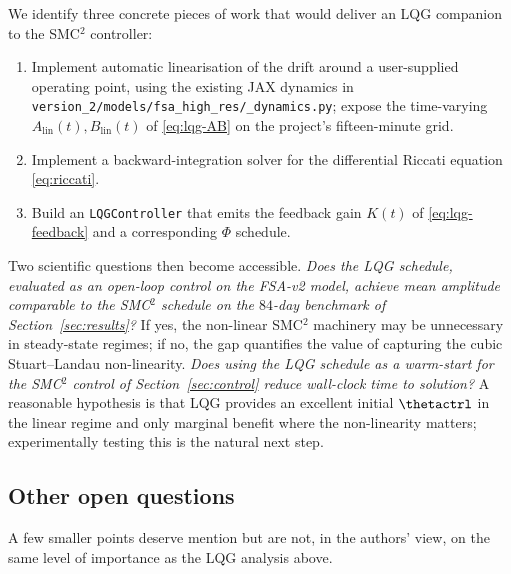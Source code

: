 We identify three concrete pieces of work that would deliver an LQG
companion to the SMC${}^2$ controller:
\begin{enumerate}
  \item Implement automatic linearisation of the drift around a
        user-supplied operating point, using the existing JAX dynamics
        in \texttt{version\_2/models/fsa\_high\_res/\_dynamics.py};
        expose the time-varying $A_{\mathrm{lin}}(t),B_{\mathrm{lin}}(t)$
        of \eqref{eq:lqg-AB} on the project's fifteen-minute grid.
  \item Implement a backward-integration solver for the differential
        Riccati equation \eqref{eq:riccati}.
  \item Build an \texttt{LQGController} that emits the feedback gain
        $K(t)$ of \eqref{eq:lqg-feedback} and a corresponding
        $\Phi$ schedule.
\end{enumerate}
Two scientific questions then become accessible. \emph{Does the LQG
schedule, evaluated as an open-loop control on the FSA-v2 model, achieve
mean amplitude comparable to the SMC${}^2$ schedule on the $84$-day
benchmark of Section~\ref{sec:results}?} If yes, the non-linear
SMC${}^2$ machinery may be unnecessary in steady-state regimes; if
no, the gap quantifies the value of capturing the cubic
Stuart--Landau non-linearity. \emph{Does using the LQG schedule as a
warm-start for the SMC${}^2$ control of Section~\ref{sec:control}
reduce wall-clock time to solution?} A reasonable hypothesis is that
LQG provides an excellent initial $\thetactrl$ in the linear regime
and only marginal benefit where the non-linearity matters;
experimentally testing this is the natural next step.

\subsection{Other open questions}\label{sec:discussion-other}

A few smaller points deserve mention but are not, in the authors'
view, on the same level of importance as the LQG analysis above.


